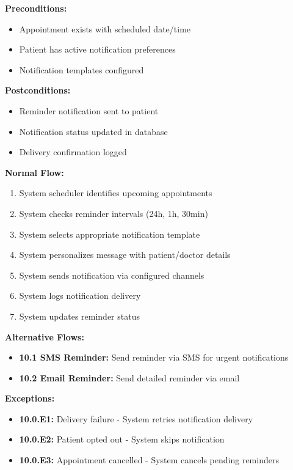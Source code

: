 \documentclass[12pt,a4paper]{article}
\begin{document}
\textbf{Preconditions:}
\begin{itemize}
    \item Appointment exists with scheduled date/time
    \item Patient has active notification preferences
    \item Notification templates configured
\end{itemize}

\textbf{Postconditions:}
\begin{itemize}
    \item Reminder notification sent to patient
    \item Notification status updated in database
    \item Delivery confirmation logged
\end{itemize}

\textbf{Normal Flow:}
\begin{enumerate}
    \item System scheduler identifies upcoming appointments
    \item System checks reminder intervals (24h, 1h, 30min)
    \item System selects appropriate notification template
    \item System personalizes message with patient/doctor details
    \item System sends notification via configured channels
    \item System logs notification delivery
    \item System updates reminder status
\end{enumerate}

\textbf{Alternative Flows:}
\begin{itemize}
    \item \textbf{10.1 SMS Reminder:} Send reminder via SMS for urgent notifications
    \item \textbf{10.2 Email Reminder:} Send detailed reminder via email
\end{itemize}

\textbf{Exceptions:}
\begin{itemize}
    \item \textbf{10.0.E1:} Delivery failure - System retries notification delivery
    \item \textbf{10.0.E2:} Patient opted out - System skips notification
    \item \textbf{10.0.E3:} Appointment cancelled - System cancels pending reminders
\end{itemize}
\end{document}
